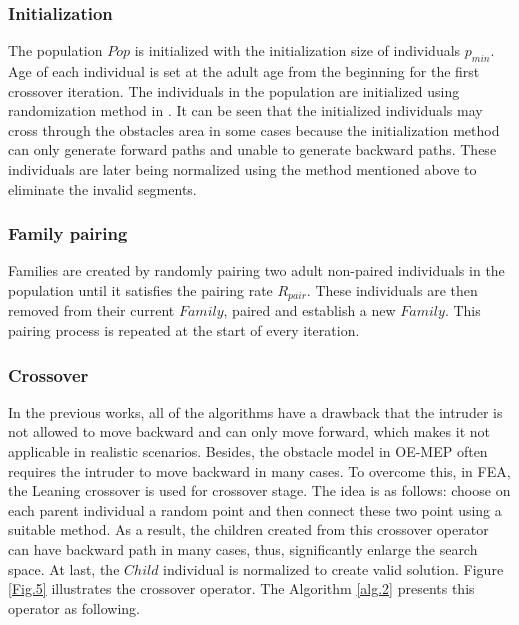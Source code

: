 \documentclass[final]{elsarticle}
\begin{document}
\subsubsection{Initialization}

The population $Pop$ is initialized with the initialization size of individuals $p_{min}$. Age of each individual is set at the adult age from the beginning for the first crossover iteration. The individuals in the population are initialized using randomization method in \cite{binh2019efficient}. It can be seen that the initialized individuals may cross through the obstacles area in some cases because the initialization method can only generate forward paths and unable to generate backward paths. These individuals are later being normalized using the method mentioned above to eliminate the invalid segments.

\subsubsection{Family pairing}

Families are created by randomly pairing two adult non-paired individuals in the population until it satisfies the pairing rate $R_{pair}$. These individuals are then removed from their current $ Family $, paired and establish a new $Family$. This pairing process is repeated at the start of every iteration.

\subsubsection{Crossover}

In the previous works, all of the algorithms have a drawback that the intruder is not allowed to move backward and can only move forward, which makes it not applicable in realistic scenarios. Besides, the obstacle model in OE-MEP often requires the intruder to move backward in many cases. To overcome this, in FEA, the Leaning crossover is used for crossover stage. The idea is as follows: choose on each parent individual a random point and then connect these two point using a suitable method. As a result, the children created from this crossover operator can have backward path in many cases, thus, significantly enlarge the search space. At last, the $Child$ individual is normalized to create valid solution. Figure \ref{Fig.5} illustrates the crossover operator. The Algorithm \ref{alg.2} presents this operator as following.
\end{document}
